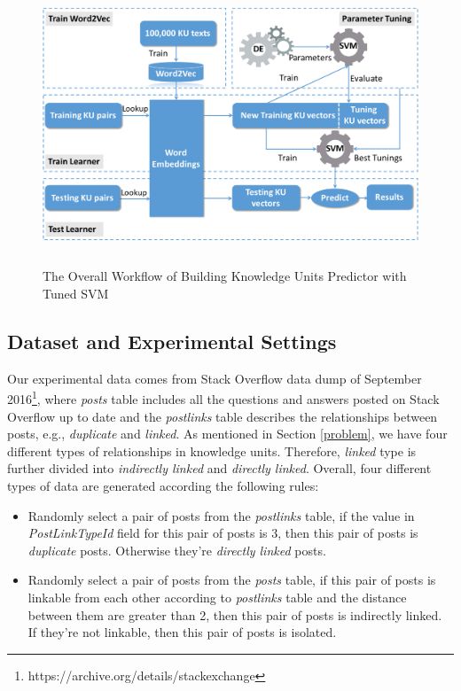 \documentclass[sigconf,review, anonymous]{acmart}
\theoremstyle{break}
\newcommand{\bi}{\begin{itemize}[leftmargin=0.4cm]}
\newcommand{\ei}{\end{itemize}}
\begin{document}
 \begin{figure}
    \centering
     \includegraphics[width=\textwidth,height=3.3in]{pic/workflow.pdf} %
    \caption{The Overall Workflow of Building Knowledge Units Predictor with Tuned SVM}
    \label{fig:workflow}
\end{figure}

\subsection{Dataset and Experimental Settings}
Our experimental data comes from Stack Overflow data dump of 
September 2016\footnote{https://archive.org/details/stackexchange},
where {\it posts} table includes all the questions and answers posted on Stack Overflow
up to date and the {\it postlinks} table describes the relationships between posts, 
e.g., {\it duplicate} and {\it linked}. As mentioned in Section
\ref{problem}, we have four different types of relationships in knowledge units.
Therefore,  {\it linked} type is further divided into {\it indirectly linked} and {\it directly linked}.
Overall, four different types of data are generated according the following rules:
\bi
\item Randomly select a pair of posts from the {\it postlinks} table, if the value
in  {\it PostLinkTypeId} field for this pair of posts is $3$, then this pair of posts is {\it duplicate} posts. 
Otherwise they're {\it directly linked} posts.

\item Randomly select a pair of posts from the {\it posts} table, if this pair of posts is linkable from each other according to
{\it postlinks} table and the distance between them are greater than 2, then this pair of posts is indirectly linked. If they're
not linkable, then this pair of posts is {isolated}.
\ei
\end{document}
